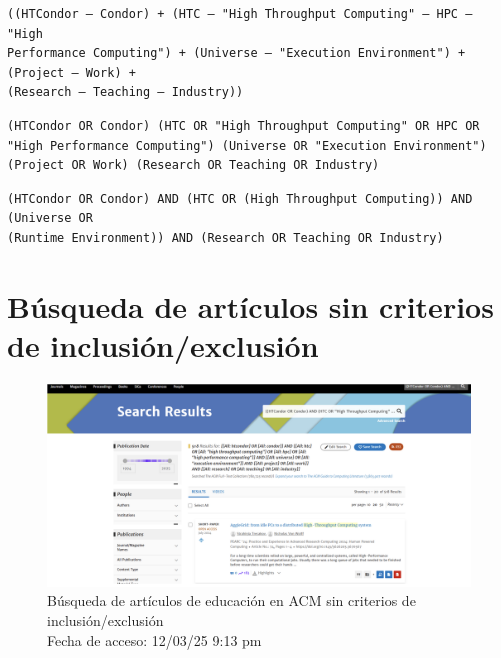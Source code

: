 \begin{tcolorbox}[
		colback=gray!5,
		colframe=black!60,
		title=Cadena de búsqueda en Springer,
		fonttitle=\bfseries,
		sharp corners=south
	]
	\scriptsize
	\begin{verbatim}
((HTCondor — Condor) + (HTC — "High Throughput Computing" — HPC — "High
Performance Computing") + (Universe — "Execution Environment") + (Project — Work) +
(Research — Teaching — Industry))
	\end{verbatim}
\end{tcolorbox}

\begin{tcolorbox}[
		colback=gray!5,
		colframe=black!60,
		title=Cadena de búsqueda en ScienceDirect,
		fonttitle=\bfseries,
		sharp corners=south
	]
	\scriptsize
	\begin{verbatim}
(HTCondor OR Condor) (HTC OR "High Throughput Computing" OR HPC OR
"High Performance Computing") (Universe OR "Execution Environment")
(Project OR Work) (Research OR Teaching OR Industry)
	\end{verbatim}
\end{tcolorbox}

\begin{tcolorbox}[
		colback=gray!5,
		colframe=black!60,
		title=Cadena de búsqueda en Taylor \& Francis,
		fonttitle=\bfseries,
		sharp corners=south
	]
	\scriptsize
	\begin{verbatim}
(HTCondor OR Condor) AND (HTC OR (High Throughput Computing)) AND (Universe OR
(Runtime Environment)) AND (Research OR Teaching OR Industry)
  \end{verbatim}
\end{tcolorbox}


\section{Búsqueda de artículos sin criterios de inclusión/exclusión}\label{sec:busqueda-sin-criterios}


\begin{figure}[H]
	\centering
	\includegraphics[width=\textwidth,keepaspectratio]{apendices/bases-datos/sin-exclusion/acm.png}
	\caption{Búsqueda de artículos de educación en ACM sin criterios de inclusión/exclusión \\
		Fecha de acceso: 12/03/25 9:13 pm
	}\label{fig:busqueda-acm-no-exclusion}
\end{figure}

